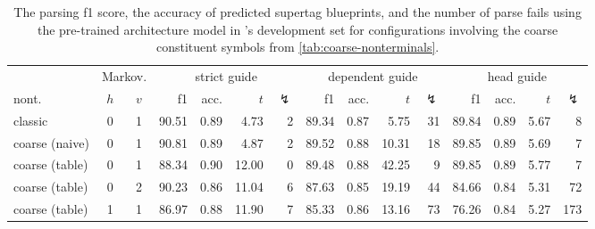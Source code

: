 \documentclass[../../document.tex]{subfiles}
\begin{document}
    \begin{table}
        \caption{\label{tbl:gridsearch:coarse:3}
        The parsing f1 score, the accuracy of predicted supertag blueprints, and the number of parse fails using the pre-trained architecture model in \negra{}'s development set for configurations involving the coarse constituent symbols from \cref{tab:coarse-nonterminals}.
        }
        \centering
        \vspace{.2cm}
        \setlength{\tabcolsep}{3.5pt}
        \begin{tabular}{lcc|rrrr|rrrr|rrrr}
            \toprule
    & \multicolumn{2}{c|}{Markov.}         & \multicolumn{4}{c|}{strict guide} &  \multicolumn{4}{c|}{dependent guide} &  \multicolumn{4}{c}{head guide} \\
    nont.           & \(h\) & \(v\) & f1 & acc. & $t$ & $\lightning$ & f1 & acc. & $t$ & $\lightning$  & f1 & acc. & $t$ & $\lightning$  \\ \hline\rowcolor{black!10}
classic        & 0 & 1 & 90.51 & 0.89 &  4.73 & 2 & 89.34 & 0.87 &  5.75 & 31 & 89.84 & 0.89 & 5.67 & 8 \\\rowcolor{black!10}
coarse (naive) & 0 & 1 & 90.81 & 0.89 &  4.87 & 2 & 89.52 & 0.88 & 10.31 & 18 & 89.85 & 0.89 & 5.69 & 7 \\\hline
coarse (table) & 0 & 1 & 88.34 & 0.90 & 12.00 & 0 & 89.48 & 0.88 & 42.25 &  9 & 89.85 & 0.89 & 5.77 & 7 \\
coarse (table) & 0 & 2 & 90.23 & 0.86 & 11.04 & 6 & 87.63 & 0.85 & 19.19 & 44 & 84.66 & 0.84 & 5.31 & 72 \\
coarse (table) & 1 & 1 & 86.97 & 0.88 & 11.90 & 7 & 85.33 & 0.86 & 13.16 & 73 & 76.26 & 0.84 & 5.27 & 173 \\
\bottomrule
        \end{tabular}
    \end{table}
\end{document}

